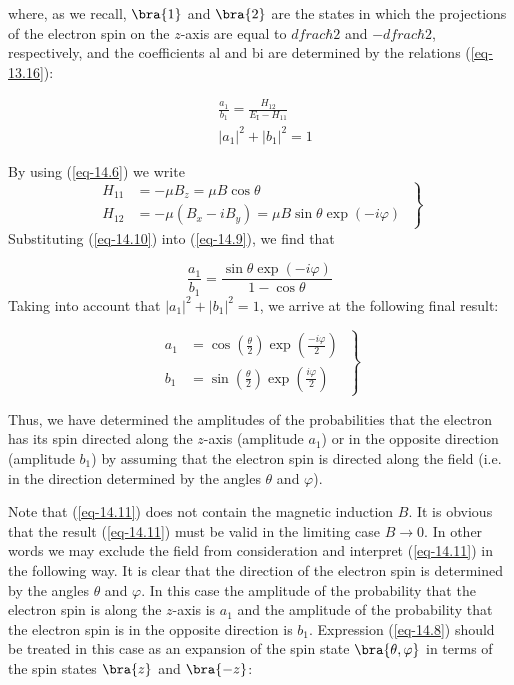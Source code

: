 \documentclass[a4paper,sfsidenotes,colorlinks=true]{tufte-book}
\numberwithin{equation}{section}
\numberwithin{figure}{section}
\begin{document}
where, as we recall, $\bra{1}$ and $\bra{2}$ are the states in which
the projections of the electron spin on the $z$-axis are equal to
$dfrac{\hbar}{2}$ and  $- dfrac{\hbar}{2}$, respectively, and the coefficients al and bi are determined by the relations (\ref{eq-13.16}):

\begin{equation}%
\begin{split}
& \frac{a_{1}}{b_{1}}  = \frac{H_{12}}{E_{\mathrm{I}} - H_{11}} \\
& |a_{1}|^{2} + |b_{1}|^{2}  = 1
\end{split}
\label{eq-14.9}
\end{equation}

By using (\ref{eq-14.6}) we write
\begin{equation}%
\left.
\begin{split}
H_{11} & = - \mu B_{z} = \mu B \cos \theta \\   
H_{12} & = - \mu (B_{x} - i B_{y}) = \mu B \sin \theta  \exp (- i \varphi)
\end{split}
\; \right\}
\label{eq-14.10}
\end{equation}
Substituting (\ref{eq-14.10}) into (\ref{eq-14.9}), we find that 

\begin{equation*}%
\frac{a_{1}}{b_{1}}  = \frac{ \sin \theta \exp ( - i \varphi) }{1 -
  \cos \theta}
\end{equation*}
Taking into account that $|a_{1}|^{2} + |b_{1}|^{2} = 1$, we arrive at
the following final result:

\begin{equation}%
\left.
\begin{split}
a_{1} & = \cos \left( \frac{\theta}{2} \right)  \exp \left( \frac{-i
    \varphi}{2} \right) \\   
b_{1} & = \sin \left( \frac{\theta}{2} \right)  \exp \left( \frac{i
    \varphi}{2} \right) 
\end{split}
\; \right\}
\label{eq-14.11}
\end{equation}

Thus, we have determined the amplitudes of the probabilities that the electron has its spin directed along the $z$-axis (amplitude $a_{1}$) or in the opposite direction (amplitude $b_{1}$) by assuming that the electron spin is directed along the field (i.e. in the direction determined by the angles $\theta$ and $\varphi$).

Note that (\ref{eq-14.11}) does not contain the magnetic induction
$B$. It is obvious that the result (\ref{eq-14.11}) must be valid in
the limiting case $B \to 0$. In other words we may exclude the field
from consideration and interpret (\ref{eq-14.11}) in the following
way. It is clear that the direction of the electron spin is determined
by the angles $\theta$ and $\varphi$. In this case the amplitude of
the probability that the electron spin is along the $z$-axis is $a_{1}$ and
the amplitude of the probability that the electron spin is in the
opposite direction is $b_{1}$. Expression (\ref{eq-14.8}) should be treated in this
case as an expansion of the spin state $\bra{\theta, \varphi}$ in terms of the spin
states $\bra{z}$ and  $\bra{-z}$: 
\end{document}
